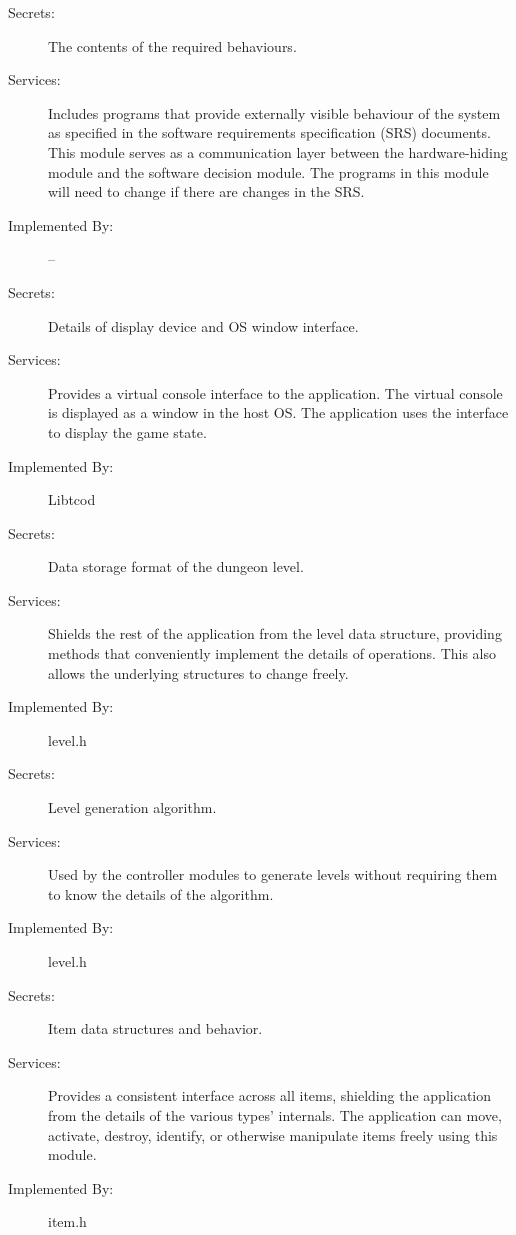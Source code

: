\documentclass[12pt, titlepage]{article}
\begin{document}
\begin{description}
\item[Secrets:]The contents of the required behaviours.
\item[Services:]Includes programs that provide externally visible behaviour of
  the system as specified in the software requirements specification (SRS)
  documents. This module serves as a communication layer between the
  hardware-hiding module and the software decision module. The programs in this
  module will need to change if there are changes in the SRS.
\item[Implemented By:] --
\end{description}

\begin{description}
\item[Secrets:]Details of display device and OS window interface.
\item[Services:]Provides a virtual console interface to the application. The virtual
console is displayed as a window in the host OS. The application uses the interface to
display the game state.
\item[Implemented By:]Libtcod
\end{description}

\begin{description}
\item[Secrets:]Data storage format of the dungeon level.
\item[Services:]Shields the rest of the application from
the level data structure, providing methods that conveniently 
implement the details of operations. This also allows the 
underlying structures to change freely.
\item[Implemented By:]level.h
\end{description}

\begin{description}
\item[Secrets:]Level generation algorithm.
\item[Services:]Used by the controller modules to generate
levels without requiring them to know the details of the algorithm.
\item[Implemented By:]level.h
\end{description}

\begin{description}
\item[Secrets:]Item data structures and behavior.
\item[Services:]Provides a consistent interface across all items,
shielding the application from the details of the various types' internals.
The application can move, activate, destroy, identify, 
or otherwise manipulate items freely using this module.
\item[Implemented By:]item.h
\end{description}
\end{document}
